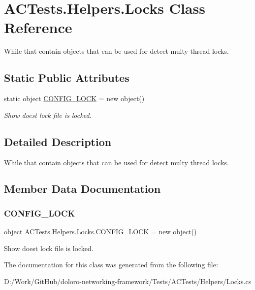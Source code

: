 \hypertarget{class_a_c_tests_1_1_helpers_1_1_locks}{}\section{A\+C\+Tests.\+Helpers.\+Locks Class Reference}
\label{class_a_c_tests_1_1_helpers_1_1_locks}


While that contain objects that can be used for detect multy thread locks.  


\subsection*{Static Public Attributes}
\begin{DoxyCompactItemize}
\item 
static object \mbox{\hyperlink{class_a_c_tests_1_1_helpers_1_1_locks_a5125daad476e3564ac0e8d624de5e5e3}{C\+O\+N\+F\+I\+G\+\_\+\+L\+O\+CK}} = new object()
\begin{DoxyCompactList}\small\item\em Show doest lock file is locked. \end{DoxyCompactList}\end{DoxyCompactItemize}


\subsection{Detailed Description}
While that contain objects that can be used for detect multy thread locks. 



\subsection{Member Data Documentation}
\mbox{\label{class_a_c_tests_1_1_helpers_1_1_locks_a5125daad476e3564ac0e8d624de5e5e3}} 
\subsubsection{\texorpdfstring{C\+O\+N\+F\+I\+G\+\_\+\+L\+O\+CK}{CONFIG\_LOCK}}
{\footnotesize\ttfamily object A\+C\+Tests.\+Helpers.\+Locks.\+C\+O\+N\+F\+I\+G\+\_\+\+L\+O\+CK = new object()\hspace{0.3cm}{\ttfamily [static]}}



Show doest lock file is locked. 



The documentation for this class was generated from the following file\+:\begin{DoxyCompactItemize}
\item 
D\+:/\+Work/\+Git\+Hub/doloro-\/networking-\/framework/\+Tests/\+A\+C\+Tests/\+Helpers/Locks.\+cs\end{DoxyCompactItemize}
